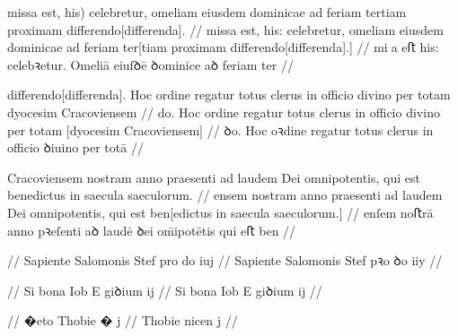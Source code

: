 

\ex \bg
\gla
{} missa est, his) celebretur, omeliam eiusdem dominicae ad feriam
tertiam proximam differendo[differenda].
//
\glRekonstrukcja
{} missa est, his: celebretur, omeliam eiusdem dominicae ad feriam
ter[tiam proximam differendo[differenda].]
//
\glU
{}
mia eﬅ his: celebꝛetur. Omeliā eiuſꝺē ꝺominice aꝺ feriam ter  
//
\endgl
\eg

\ex \bg
\gla
{} differendo[differenda].
Hoc ordine regatur totus clerus in officio divino per totam dyocesim
Cracoviensem
//
\glRekonstrukcja
{} \relax[differen]do.
Hoc ordine regatur totus clerus in officio divino per totam [dyocesim
Cracoviensem]
//
\glU
{}
ꝺo. Hoc oꝛdine regatur totus clerus in oﬀicio ꝺiuino per totā  
//
\endgl
\eg

\ex \bg
\gla
{} Cracoviensem nostram anno praesenti ad laudem Dei omnipotentis, qui
est benedictus in saecula saeculorum.
//
\glRekonstrukcja
{} \relax[Cracovi]ensem nostram anno praesenti ad laudem Dei omnipotentis, qui
est ben[edictus in saecula saeculorum.]
//
\glU
{}
enſem noﬅrā anno pꝛeſenti aꝺ laudė ꝺei om̄ipotētis qui eﬅ ben   
//
\endgl
\eg

\ex \bg
\gla
{} {} {} {} {} {} {} {} {} {}
{} {} {} {} {} {} {} {} {} {}
//
\glRekonstrukcja
{} Sapiente Salomonis Stef pro do iuj
//
\glU
{}
Sapiente Salomonis Stef pꝛo ꝺo iiy
//
\endgl
\eg

\ex \bg
\gla
{} {} {} {} {} {} {} {} {} {}
{} {} {} {} {} {} {} {} {} {}
//
\glRekonstrukcja
{} Si bona Iob E giꝺium ij
//
\glU
{}
Si bona Iob E giꝺium ij
//
\endgl
\eg

\ex \bg
\gla
{} {} {} {} {} {} {} {} {} {}
{} {} {} {} {} {} {} {} {} {}
//
\glRekonstrukcja
{} �eto Thobie � j
//
\glU
{}
{} Thobie nicen j
//
\endgl
\eg

\endinput





